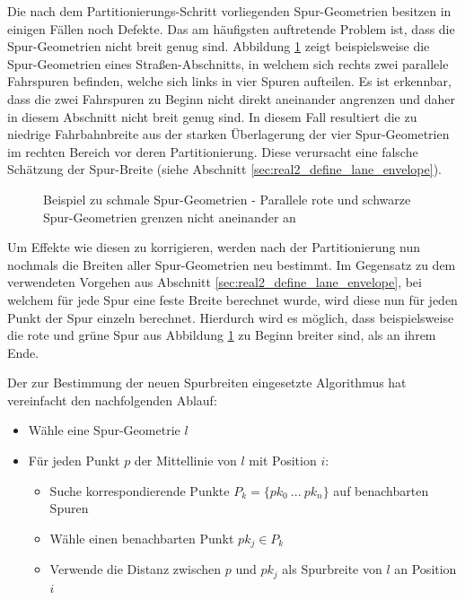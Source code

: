 Die nach dem Partitionierungs-Schritt vorliegenden Spur-Geometrien besitzen in einigen Fällen noch Defekte.
Das am häufigsten auftretende Problem ist, dass die Spur-Geometrien nicht breit genug sind.
Abbildung \ref{fig:real2_pre_opt} zeigt beispielsweise die Spur-Geometrien eines Straßen-Abschnitts,
in welchem sich rechts zwei parallele Fahrspuren befinden, welche sich links in vier Spuren aufteilen.
Es ist erkennbar, dass die zwei Fahrspuren zu Beginn nicht direkt aneinander angrenzen
und daher in diesem Abschnitt nicht breit genug sind. In diesem Fall resultiert die zu niedrige Fahrbahnbreite
aus der starken Überlagerung der vier Spur-Geometrien im rechten Bereich vor deren Partitionierung.
Diese verursacht eine falsche Schätzung der Spur-Breite (siehe Abschnitt \ref{sec:real2_define_lane_envelope}).

\begin{figure}[H]
    \centering
    \caption[Beispiel zu schmale Spur-Geometrien]
            {Beispiel zu schmale Spur-Geometrien - Parallele rote und schwarze Spur-Geometrien grenzen nicht aneinander an}
    \label{fig:real2_pre_opt}
\end{figure}

Um Effekte wie diesen zu korrigieren, werden nach der Partitionierung nun nochmals die Breiten aller Spur-Geometrien
neu bestimmt. Im Gegensatz zu dem verwendeten Vorgehen aus Abschnitt \ref{sec:real2_define_lane_envelope},
bei welchem für jede Spur eine feste Breite berechnet wurde, wird diese nun für jeden Punkt der Spur einzeln
berechnet. Hierdurch wird es möglich, dass beispielsweise die rote und grüne Spur aus Abbildung \ref{fig:real2_pre_opt}
zu Beginn breiter sind, als an ihrem Ende.

Der zur Bestimmung der neuen Spurbreiten eingesetzte Algorithmus hat vereinfacht den nachfolgenden Ablauf:

\begin{itemize}
    \item Wähle eine Spur-Geometrie $l$
    \item Für jeden Punkt $p$ der Mittellinie von $l$ mit Position $i$:
    \begin{itemize}
        \item Suche korrespondierende Punkte $P_k = \{pk_0\ ...\ pk_n\}$ auf benachbarten Spuren
        \item Wähle einen benachbarten Punkt $pk_j \in P_k$
        \item Verwende die Distanz zwischen $p$ und $pk_j$ als Spurbreite von $l$ an Position $i$
    \end{itemize}
\end{itemize}

